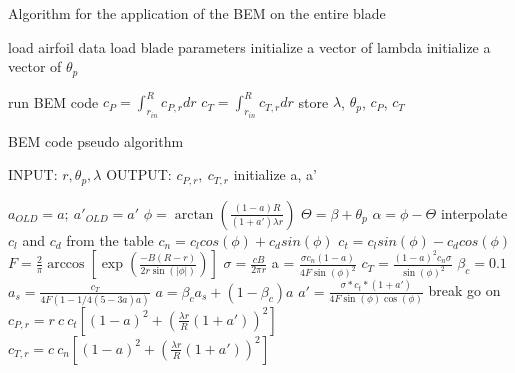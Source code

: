 \begin{algorithm}
\caption{Algorithm for the application of the BEM on the entire blade}
\label{alg:main_BEM}
\begin{algorithmic}
\State load airfoil data
\State load blade parameters
\State initialize a vector of lambda
\State initialize a vector of $\theta_p$

    \State run BEM code
    \EndFor 
    \State $c_P = \int_{r_{in}}^{R}c_{P,r}dr$
    \State $c_T = \int_{r_{in}}^{R}c_{T,r}dr$
    \State store $\lambda$, $\theta_p$, $c_P$, $c_T$
 \EndFor
\EndFor 
\end{algorithmic}
\end{algorithm}

\begin{algorithm}
\caption{BEM code pseudo algorithm}
\label{alg:detailed_BEM}
\begin{algorithmic}
\State INPUT: $r, \theta_p, \lambda$
\State OUTPUT: $c_{P,r}, \ c_{T,r}$
\State initialize a, a'

  \State  $a_{OLD}=a; \ a'_{OLD}=a'$
  \State  $\phi = \arctan\left(\frac{(1-a)R}{(1+a')\lambda r}\right)$ 
  \State  $\Theta = \beta + \theta_p$
  \State  $\alpha = \phi - \Theta$
  \State  interpolate $c_l$ and $c_d$ from the table
  \State  $c_n = c_l cos(\phi) + c_d sin(\phi)$
  \State  $c_t = c_l sin(\phi) - c_d cos(\phi)$
  \State  $F = \frac{2}{\pi} \arccos \left[\exp\left(\frac{-B(R - r)}{2r\sin(\left|\phi\right|)}\right)\right]$
  \State  $\sigma = \frac{cB}{2\pi r}$
  \State  a = $\frac{\sigma c_n (1 - a)}{4 F \sin(\phi)^2}$
  \Else
    \State  $c_T = \frac{(1 - a)^2c_n\sigma}{\sin(\phi)^2}$
    \State  $\beta_c = 0.1$
    \State  $a_s = \frac{c_T}{4F(1 - 1/4(5 - 3a)a)}$
    \State  $a = \beta_c a_s + (1 - \beta_c)a$
  \EndIf
  \State  $a' = \frac{\sigma*c_t*(1 + a')}{4F\sin(\phi)\cos(\phi)}$
    \State break
  \Else
    \State go on
  \EndIf
\EndFor
\State  $c_{P,r} = r \ c \ c_t\left[(1 - a)^2 + \left(\frac{\lambda r}{R}(1 + a')\right)^2\right]$
\State  $c_{T,r} = c \ c_n\left[(1 - a)^2 + \left(\frac{\lambda r}{R}(1 + a')\right)^2\right]$
\end{algorithmic}
\end{algorithm}